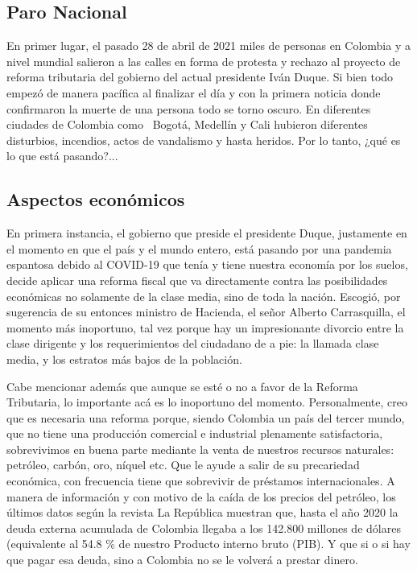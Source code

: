 \documentclass[doc, 12pt, letterpaper, donotrepeattitle, floatsintext, natbib]{apa7}
\begin{document}
\subsection{Paro Nacional} 
En primer lugar, el pasado 28 de abril de 2021 miles de personas en Colombia y a nivel mundial salieron a las calles en forma de protesta y rechazo al proyecto de reforma tributaria del gobierno del actual presidente Iván Duque. Si bien todo empezó de manera pacífica al finalizar el día y con la primera noticia donde confirmaron la muerte de una persona todo se torno oscuro. En diferentes ciudades de Colombia como \ Bogotá, Medellín y Cali hubieron diferentes disturbios, incendios, actos de vandalismo y hasta heridos. Por lo tanto, ¿qué es lo que está pasando?...


\subsection{Aspectos económicos} 
En primera instancia, el gobierno que preside el presidente Duque, justamente en el momento en que el país y el mundo entero, está pasando por una pandemia espantosa debido al COVID-19 que tenía y tiene nuestra economía por los suelos, decide aplicar una reforma fiscal que va directamente contra las posibilidades económicas no solamente de la clase media, sino de toda la nación. Escogió, por sugerencia de su entonces ministro de Hacienda, el señor Alberto Carrasquilla, el momento más inoportuno, tal vez porque hay un impresionante divorcio entre la clase dirigente y los requerimientos del ciudadano de a pie: la llamada clase media, y los estratos más bajos de la población.

Cabe mencionar además que aunque se esté o no a favor de la Reforma Tributaria, lo importante acá es lo inoportuno del momento. Personalmente, creo que es necesaria una reforma porque, siendo Colombia un país del tercer mundo, que no tiene una producción comercial e industrial plenamente satisfactoria, sobrevivimos en buena parte mediante la venta de nuestros recursos naturales: petróleo, carbón, oro, níquel etc. Que le ayude a salir de su precariedad económica, con frecuencia tiene que sobrevivir de préstamos internacionales. A manera de información y con motivo de la caída de los precios del petróleo, los últimos datos según la revista La República muestran que, hasta el año 2020 la deuda externa acumulada de Colombia llegaba a los 142.800 millones de dólares (equivalente al 54.8
\% de nuestro Producto interno bruto (PIB). Y que si o si hay que pagar esa deuda, sino a Colombia no se le volverá a prestar dinero.
\end{document}
